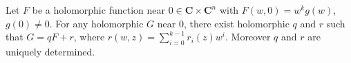 Let $F$ be a holomorphic function near $0 \in \mathbf{C} \times \mathbf{C}^n$ with $F(w, 0) = w^k g(w)$, $g(0) \neq 0$. For any holomorphic $G$ near $0$, there exist holomorphic $q$ and $r$ such that $G = qF + r$, where $r(w, z) = \sum_{i=0}^{k-1} r_i(z) w^i$. Moreover $q$ and $r$ are uniquely determined.
